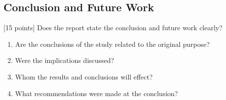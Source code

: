\documentclass{winslabreport}
\begin{document}
\subsection{Conclusion and Future Work}
[15 points] Does the report state the conclusion and future work clearly?
\begin{enumerate}
    \item Are the conclusions of the study related to the original purpose?
    \item Were the implications discussed?
    \item Whom the results and conclusions will effect?
    \item What recommendations were made at the conclusion?
\end{enumerate}
\end{document}
